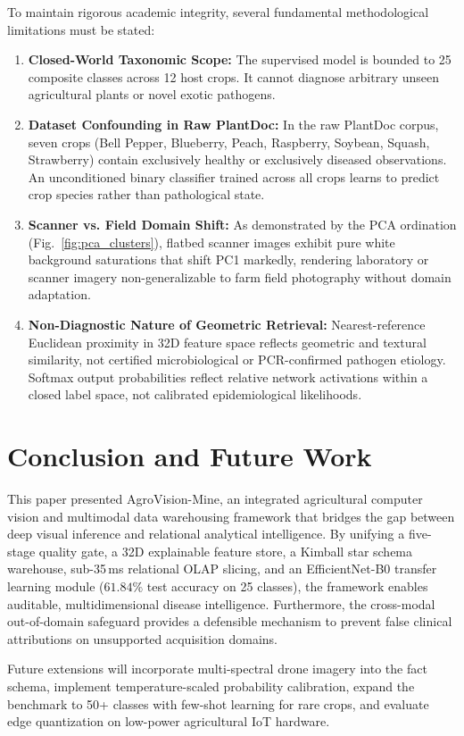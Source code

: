 \documentclass[conference]{IEEEtran}
\begin{document}
To maintain rigorous academic integrity, several fundamental methodological limitations must be stated:
\begin{enumerate}
    \item \textbf{Closed-World Taxonomic Scope:} The supervised model is bounded to 25 composite classes across 12 host crops. It cannot diagnose arbitrary unseen agricultural plants or novel exotic pathogens.
    \item \textbf{Dataset Confounding in Raw PlantDoc:} In the raw PlantDoc corpus, seven crops (Bell Pepper, Blueberry, Peach, Raspberry, Soybean, Squash, Strawberry) contain exclusively healthy or exclusively diseased observations. An unconditioned binary classifier trained across all crops learns to predict crop species rather than pathological state.
    \item \textbf{Scanner vs. Field Domain Shift:} As demonstrated by the PCA ordination (Fig.~\ref{fig:pca_clusters}), flatbed scanner images exhibit pure white background saturations that shift PC1 markedly, rendering laboratory or scanner imagery non-generalizable to farm field photography without domain adaptation.
    \item \textbf{Non-Diagnostic Nature of Geometric Retrieval:} Nearest-reference Euclidean proximity in 32D feature space reflects geometric and textural similarity, not certified microbiological or PCR-confirmed pathogen etiology. Softmax output probabilities reflect relative network activations within a closed label space, not calibrated epidemiological likelihoods.
\end{enumerate}

\section{Conclusion and Future Work}
This paper presented AgroVision-Mine, an integrated agricultural computer vision and multimodal data warehousing framework that bridges the gap between deep visual inference and relational analytical intelligence. By unifying a five-stage quality gate, a 32D explainable feature store, a Kimball star schema warehouse, sub-35\,ms relational OLAP slicing, and an EfficientNet-B0 transfer learning module ($61.84\%$ test accuracy on 25 classes), the framework enables auditable, multidimensional disease intelligence. Furthermore, the cross-modal out-of-domain safeguard provides a defensible mechanism to prevent false clinical attributions on unsupported acquisition domains.

Future extensions will incorporate multi-spectral drone imagery into the fact schema, implement temperature-scaled probability calibration, expand the benchmark to 50+ classes with few-shot learning for rare crops, and evaluate edge quantization on low-power agricultural IoT hardware.



\end{document}
